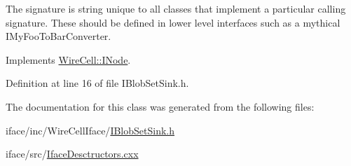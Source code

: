 The signature is string unique to all classes that implement a particular calling signature. These should be defined in lower level interfaces such as a mythical I\+My\+Foo\+To\+Bar\+Converter. 

Implements \hyperlink{class_wire_cell_1_1_i_node_a0b0763465adf5ba7febe8e378162b584}{Wire\+Cell\+::\+I\+Node}.



Definition at line 16 of file I\+Blob\+Set\+Sink.\+h.



The documentation for this class was generated from the following files\+:\begin{DoxyCompactItemize}
\item 
iface/inc/\+Wire\+Cell\+Iface/\hyperlink{_i_blob_set_sink_8h}{I\+Blob\+Set\+Sink.\+h}\item 
iface/src/\hyperlink{_iface_desctructors_8cxx}{Iface\+Desctructors.\+cxx}\end{DoxyCompactItemize}
